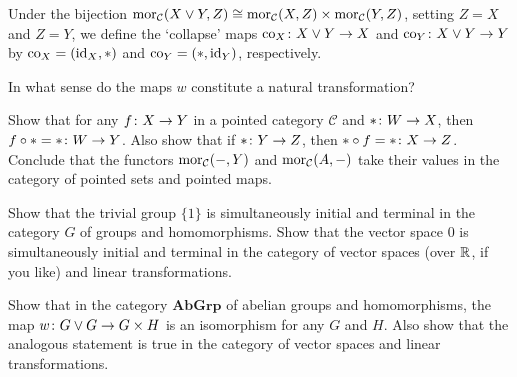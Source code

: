 \item Under the bijection $\operatorname{mor}_{\mathcal{C}}(X\lor Y,Z) \cong\operatorname{mor}_{\mathcal{C}}(X,Z) \times \operatorname{mor}_{\mathcal{C}}(Y, Z)$, setting $Z=X$ and $Z=Y$, we define the `collapse' maps $\mathrm{co}_X\colon X\lor Y\to X$ and $\mathrm{co}_Y\colon X\lor Y\to Y$ by $\mathrm{co}_X=(\mathrm{id}_X,*)$ and $\mathrm{co}_Y=(*,\mathrm{id}_Y)$, respectively.
\een
\es

\bx
In what sense do the maps $w$ constitute a natural transformation?
\ex

\bs
\es

\bp
Show that for any $f\colon X \to Y$ in a pointed category $\mathcal{C}$ and $*\colon W\to X$, then $f\circ * = *\colon W\to Y$. Also show that if $*\colon Y\to Z$, then $*\circ f=*\colon X\to Z$. Conclude that the functors $\operatorname{mor}_{\mathcal{C}}(-,Y)$ and $\operatorname{mor}_{\mathcal{C}}(A,-)$ take their values in the category of pointed sets and pointed maps.
\ep

\bs

\es

\bx
\ben[label=(\alph*)]
\item Show that the trivial group $\{1\}$ is simultaneously initial and terminal in the category $G$ of groups and homomorphisms. Show that the vector space $0$ is simultaneously initial and terminal in the category of vector spaces (over $\mathbb{R}$, if you like) and linear transformations.
\item Show that in the category $\mathbf{AbGrp}$ of abelian groups and homomorphisms, the map $w \colon G \lor G \to G \times H$ is an isomorphism for any $G$ and $H$.
Also show that the analogous statement is true in the category of vector spaces and linear transformations.
\een
\ex

\bs
\ben[label=(\alph*)]
\item
\item
\een
\es

